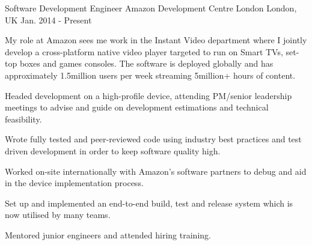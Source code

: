 
\begin{cventries}

  \cventry
    {Software Development Engineer} %
    {Amazon Development Centre London} %
    {London, UK} %
    {Jan. 2014 - Present} %
    {
      \begin{cventrysummary}
      My role at Amazon sees me work in the Instant Video department where I jointly
      develop a cross-platform native video player targeted to run on Smart TVs,
      set-top boxes and games consoles. The software is deployed globally and
      has approximately 1.5million users per week streaming 5million+ hours of
      content.
      \end{cventrysummary}
      \begin{cvitems} %
        \item {Headed development on a high-profile device, attending PM/senior leadership meetings to advise and guide on development estimations and technical feasibility.}
        \item {Wrote fully tested and peer-reviewed code using industry best practices and test driven development in order to keep software quality high.}
        \item {Worked on-site internationally with Amazon’s software partners to debug and aid in the device implementation process.}
        \item {Set up and implemented an end-to-end build, test and release system which is now utilised by many teams.}
        \item {Mentored junior engineers and attended hiring training.}
      \end{cvitems}
    }


\end{cventries}
